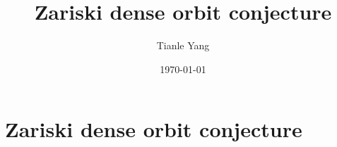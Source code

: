 \documentclass[sectionlevel=section,status=draft]{noteformyself}
\title{Zariski dense orbit conjecture}
\author{Tianle Yang}
\date{\today}
\begin{document}
\maketitle

    \section[
      status=draft,
      tag=00000,
      label=\labelNFM{sec:periodic-points-and-orbits:zariski-dense-orbit-conjecture}
    ]{Zariski dense orbit conjecture}



\end{document}
